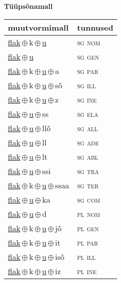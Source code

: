 

\vspace{3.5em}
\noindent \begin{minipage}{\textwidth}
\noindent \textbf{Tüüpsõnamall \,}\\

\begin{sideways}
\begin{tabular}{l l}
muutvormimall & tunnused \\
\hline
\underline{flak}\,$\oplus$\,k\,$\oplus$\,\underline{u} & \textsc{ sg nom } \\
\underline{flak}\,$\oplus$\,\underline{u} & \textsc{ sg gen } \\
\underline{flak}\,$\oplus$\,k\,$\oplus$\,\underline{u}\,$\oplus$\,a & \textsc{ sg par } \\
\underline{flak}\,$\oplus$\,k\,$\oplus$\,\underline{u}\,$\oplus$\,sõ & \textsc{ sg ill } \\
\underline{flak}\,$\oplus$\,k\,$\oplus$\,\underline{u}\,$\oplus$\,z & \textsc{ sg ine } \\
\underline{flak}\,$\oplus$\,\underline{u}\,$\oplus$\,ss & \textsc{ sg ela } \\
\underline{flak}\,$\oplus$\,\underline{u}\,$\oplus$\,llõ & \textsc{ sg all } \\
\underline{flak}\,$\oplus$\,\underline{u}\,$\oplus$\,ll & \textsc{ sg ade } \\
\underline{flak}\,$\oplus$\,\underline{u}\,$\oplus$\,lt & \textsc{ sg abl } \\
\underline{flak}\,$\oplus$\,\underline{u}\,$\oplus$\,ssi & \textsc{ sg tra } \\
\underline{flak}\,$\oplus$\,k\,$\oplus$\,\underline{u}\,$\oplus$\,ssaa & \textsc{ sg ter } \\
\underline{flak}\,$\oplus$\,\underline{u}\,$\oplus$\,ka & \textsc{ sg com } \\
\underline{flak}\,$\oplus$\,\underline{u}\,$\oplus$\,d & \textsc{ pl nom } \\
\underline{flak}\,$\oplus$\,k\,$\oplus$\,\underline{u}\,$\oplus$\,jõ & \textsc{ pl gen } \\
\underline{flak}\,$\oplus$\,k\,$\oplus$\,\underline{u}\,$\oplus$\,it & \textsc{ pl par } \\
\underline{flak}\,$\oplus$\,k\,$\oplus$\,\underline{u}\,$\oplus$\,isõ & \textsc{ pl ill } \\
\underline{flak}\,$\oplus$\,k\,$\oplus$\,\underline{u}\,$\oplus$\,iz & \textsc{ pl ine } \\

\end{tabular}
\end{sideways}
\end{minipage}
